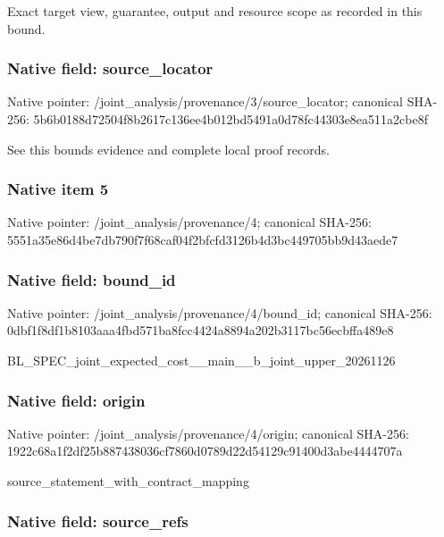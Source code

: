 \documentclass[10pt,a4paper]{article}
\begin{document}
Exact target view, guarantee, output and resource scope as recorded in this bound.


\subsubsection{Native field: source\_locator}


Native pointer: /joint\_analysis/provenan\allowbreak{}ce/3/source\_locator; canonical SHA-256: 5b6b0188d72504f8b2617c13\allowbreak{}6ee4b012bd5491a0d78fc443\allowbreak{}03e8ea511a2cbe8f


See this bounds evidence and complete local proof records.


\subsubsection{Native item 5}


Native pointer: /joint\_analysis/provenance/4; canonical SHA-256: 5551a35e86d4be7db790f7f6\allowbreak{}8caf04f2bfcfd3126b4d3bc4\allowbreak{}49705bb9d43aede7



\subsubsection{Native field: bound\_id}


Native pointer: /joint\_analysis/provenance/4/bound\_id; canonical SHA-256: 0dbf1f8df1b8103aaa4fbd57\allowbreak{}1ba8fcc4424a8894a202b311\allowbreak{}7bc56ecbffa489e8


BL\_SPEC\_joint\_expected\_c\allowbreak{}ost\_\_main\_\_b\_joint\_upper\allowbreak{}\_20261126


\subsubsection{Native field: origin}


Native pointer: /joint\_analysis/provenance/4/origin; canonical SHA-256: 1922c68a1f2df25b88743803\allowbreak{}6cf7860d0789d22d54129c91\allowbreak{}400d3abe4444707a


source\_statement\_with\_contract\_mapping


\subsubsection{Native field: source\_refs}
\end{document}
